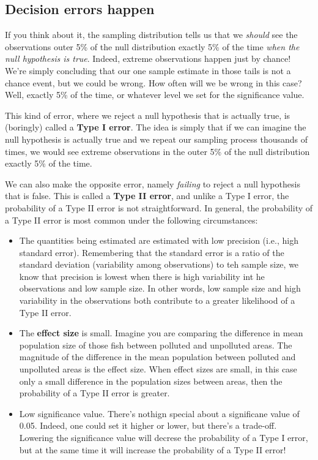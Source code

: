 \documentclass[
]{book}
\providecommand{\tightlist}{%
  \setlength{\itemsep}{0pt}\setlength{\parskip}{0pt}}
\begin{document}
\subsection{Decision errors happen}\label{decision-errors-happen}

If you think about it, the sampling distribution tells us that we \emph{should} see the observations outer 5\% of the null distribution exactly 5\% of the time \emph{when the null hypothesis is true}. Indeed, extreme observations happen just by chance! We're simply concluding that our one sample estimate in those tails is not a chance event, but we could be wrong. How often will we be wrong in this case? Well, exactly 5\% of the time, or whatever level we set for the significance value.

This kind of error, where we reject a null hypothesis that is actually true, is (boringly) called a \textbf{Type I error}. The idea is simply that if we can imagine the null hypothesis is actually true and we repeat our sampling process thousands of times, we would see extreme observations in the outer 5\% of the null distribution exactly 5\% of the time.

We can also make the opposite error, namely \emph{failing} to reject a null hypothesis that is false. This is called a \textbf{Type II error}, and unlike a Type I error, the probability of a Type II error is not straightforward. In general, the probability of a Type II error is most common under the following circumstances:

\begin{itemize}
\tightlist
\item
  The quantities being estimated are estimated with low precision (i.e., high standard error). Remembering that the standard error is a ratio of the standard deviation (variability among observations) to teh sample size, we know that precision is lowest when there is high variability int he observations and low sample size. In other words, low sample size and high variability in the observations both contribute to a greater likelihood of a Type II error.
\item
  The \textbf{effect size} is small. Imagine you are comparing the difference in mean population size of those fish between polluted and unpolluted areas. The magnitude of the difference in the mean population between polluted and unpolluted areas is the effect size. When effect sizes are small, in this case only a small difference in the population sizes between areas, then the probability of a Type II error is greater.
\item
  Low significance value. There's nothign special about a significane value of 0.05. Indeed, one could set it higher or lower, but there's a trade-off. Lowering the significance value will decrese the probability of a Type I error, but at the same time it will increase the probability of a Type II error!
\end{itemize}
\end{document}
